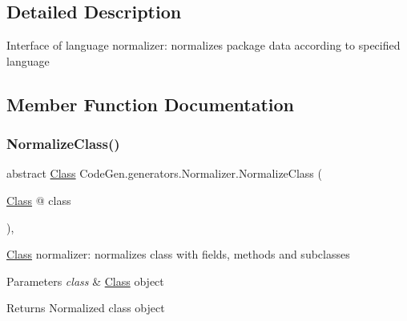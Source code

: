 \subsection{Detailed Description}
Interface of language normalizer\+: normalizes package data according to specified language 



\subsection{Member Function Documentation}
\mbox{\label{classCodeGen_1_1generators_1_1Normalizer_ae79262a7509b9d78393262dccf63dcc5}} 
\subsubsection{\texorpdfstring{Normalize\+Class()}{NormalizeClass()}}
{\footnotesize\ttfamily abstract \mbox{\hyperlink{classCodeGen_1_1generators_1_1Class}{Class}} Code\+Gen.\+generators.\+Normalizer.\+Normalize\+Class (\begin{DoxyParamCaption}\item[{\mbox{\hyperlink{classCodeGen_1_1generators_1_1Class}{Class}} @}]{class }\end{DoxyParamCaption})\hspace{0.3cm}{\ttfamily [protected]}, {}}



\mbox{\hyperlink{classCodeGen_1_1generators_1_1Class}{Class}} normalizer\+: normalizes class with fields, methods and subclasses 


\begin{DoxyParams}{Parameters}
{\em class} & \mbox{\hyperlink{classCodeGen_1_1generators_1_1Class}{Class}} object\\
\hline
\end{DoxyParams}
\begin{DoxyReturn}{Returns}
Normalized class object
\end{DoxyReturn}
\mbox{\label{classCodeGen_1_1generators_1_1Normalizer_aafd7bd1d143fb2082a0e4ef53fcbb46b}} 
